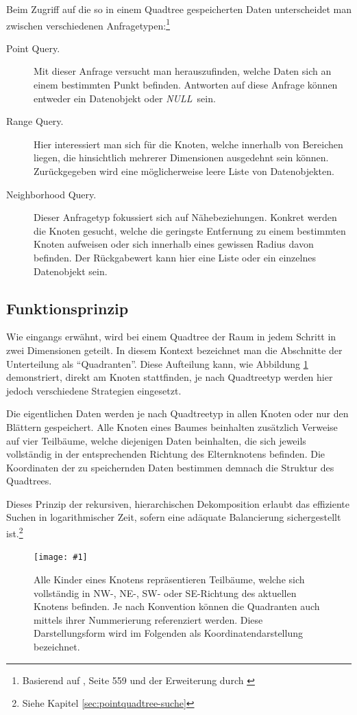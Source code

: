 \documentclass[%
			paper=a4,%
			DIV12,
			liststotoc,
			bibtotoc,
			draft=false,%
			titlepage,
			numbers=noendperiod
			]{scrartcl}
\newcommand{\mynull}{\textit{NULL}}
\newcommand{\myfig}[5] {
 \begin{figure}[tbph]
	 \centering
	 \texttt{[image: \#1]}
	 \caption[#4]{#5}
	 \label{fig:#2}
 \end{figure}
}
\begin{document}
Beim Zugriff auf die so in einem Quadtree gespeicherten Daten unterscheidet man zwischen verschiedenen Anfragetypen:\footnote{Basierend auf \cite{Knuth:1998:ACP:280635}, Seite 559 und der Erweiterung durch \cite{Bentley:1975:nearest}}
\begin{description}
	\item[Point Query.]
		Mit dieser Anfrage versucht man herauszufinden, welche Daten sich an einem bestimmten Punkt befinden.
		Antworten auf diese Anfrage können entweder ein Datenobjekt oder \mynull\ sein.
	\item[Range Query.]
		Hier interessiert man sich für die Knoten, welche innerhalb von Bereichen liegen, die hinsichtlich mehrerer Dimensionen ausgedehnt sein können.
		Zurückgegeben wird eine möglicherweise leere Liste von Datenobjekten.
	\item[Neighborhood Query.]
		Dieser Anfragetyp fokussiert sich auf Nähebeziehungen.
		Konkret werden die Knoten gesucht, welche die geringste Entfernung zu einem bestimmten Knoten aufweisen oder sich innerhalb eines gewissen Radius davon befinden.
		Der Rückgabewert kann hier eine Liste oder ein einzelnes Datenobjekt sein.
\end{description}


\subsection{Funktionsprinzip}

Wie eingangs erwähnt, wird bei einem Quadtree der Raum in jedem Schritt in zwei Dimensionen geteilt.
In diesem Kontext bezeichnet man die Abschnitte der Unterteilung als "`Quadranten"'.
Diese Aufteilung kann, wie Abbildung \ref{fig:quadtree} demonstriert, direkt am Knoten stattfinden, je nach Quadtreetyp werden hier jedoch verschiedene Strategien eingesetzt.

Die eigentlichen Daten werden je nach Quadtreetyp in allen Knoten oder nur den Blättern gespeichert.
Alle Knoten eines Baumes beinhalten zusätzlich Verweise auf vier Teilbäume, welche diejenigen Daten beinhalten, die sich jeweils vollständig in der entsprechenden Richtung des Elternknotens befinden. 
Die Koordinaten der zu speichernden Daten bestimmen demnach die Struktur des Quadtrees.

Dieses Prinzip der rekursiven, hierarchischen Dekomposition erlaubt das effiziente Suchen in logarithmischer Zeit, sofern eine adäquate Balancierung sichergestellt ist.\footnote{Siehe Kapitel \ref{sec:pointquadtree-suche}}
\myfig{img/quadtree}{quadtree}{width=.6\textwidth}{Funktionsprinzip eines Quadtrees}{Alle Kinder eines Knotens repräsentieren Teilbäume, welche sich vollständig in NW-, NE-, \mbox{SW-} oder SE-Richtung des aktuellen Knotens befinden. Je nach Konvention können die Quadranten auch mittels ihrer Nummerierung referenziert werden. Diese Darstellungsform wird im Folgenden als Koordinatendarstellung bezeichnet.}
\end{document}
